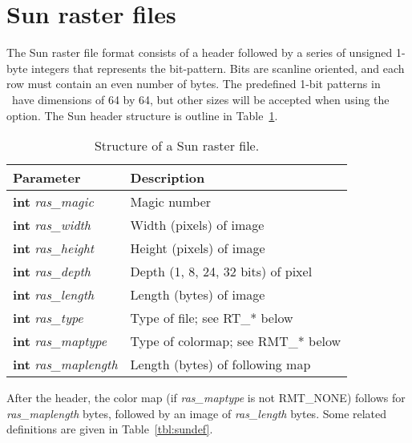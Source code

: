 \section{Sun raster files}

The Sun raster file format consists of a header followed by a series
of unsigned 1-byte integers that represents the bit-pattern.  Bits
are scanline oriented, and each row must contain an even number of
bytes.  The predefined 1-bit
patterns in \GMT\ have dimensions of 64 by 64, but other sizes will be
accepted when using the  option.  The Sun header structure
is outline in Table~\ref{tbl:sunheader}.

\begin{table}[H]
\centering

\begin{tabular}{ll} \hline
\textbf{Parameter}} & \textbf{Description}} \\ \hline\hline
\textbf{int} \emph{ras\_magic} & Magic number \\
\textbf{int} \emph{ras\_width} & Width (pixels) of image \\
\textbf{int} \emph{ras\_height} & Height (pixels) of image \\
\textbf{int} \emph{ras\_depth} & Depth (1, 8, 24, 32 bits) of pixel \\
\textbf{int} \emph{ras\_length} & Length (bytes) of image \\
\textbf{int} \emph{ras\_type} & Type of file; see RT\_* below \\
\textbf{int} \emph{ras\_maptype} & Type of colormap; see RMT\_* below \\
\textbf{int} \emph{ras\_maplength} & Length (bytes) of following map \\\hline
\end{tabular}

\caption{Structure of a Sun raster file.}
\label{tbl:sunheader}
\end{table}

After the header, the color map (if \emph{ras\_maptype} is not RMT\_NONE)
follows for \emph{ras\_maplength} bytes, followed by an image of
\emph{ras\_length} bytes.  Some related definitions are given in Table~\ref{tbl:sundef}.


